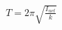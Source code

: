 \documentclass[preview]{standalone}
\begin{document}
\begin{align*}
T = 2\pi \sqrt{\frac{I_{net}}{k}}
\end{align*}
\end{document}
